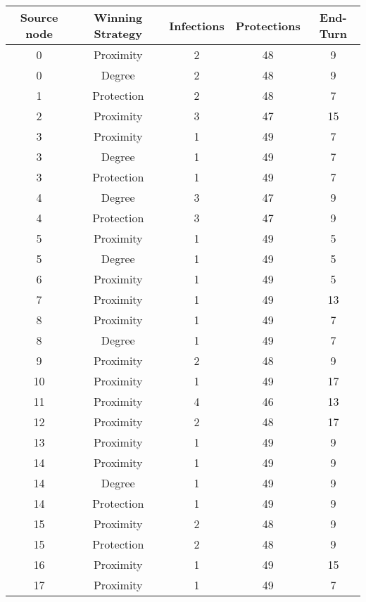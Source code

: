 \documentclass[results.tex]{subfiles}
\begin{document}
\begin{center}
  \begin{tabular}{| c || c | c | c | c |}
    \hline
    {\bfseries Source node} & {\bfseries Winning Strategy} & {\bfseries Infections} & {\bfseries Protections} & {\bfseries End-Turn} \\  %
    \hline\hline
    0 & Proximity & 2 & 48 & 9 \\ 
    \hline
    0 & Degree & 2 & 48 & 9 \\ 
    \hline
    1 & Protection & 2 & 48 & 7 \\ 
    \hline
    2 & Proximity & 3 & 47 & 15 \\ 
    \hline
    3 & Proximity & 1 & 49 & 7 \\ 
    \hline
    3 & Degree & 1 & 49 & 7 \\ 
    \hline
    3 & Protection & 1 & 49 & 7 \\ 
    \hline
    4 & Degree & 3 & 47 & 9 \\ 
    \hline
    4 & Protection & 3 & 47 & 9 \\ 
    \hline
    5 & Proximity & 1 & 49 & 5 \\ 
    \hline
    5 & Degree & 1 & 49 & 5 \\ 
    \hline
    6 & Proximity & 1 & 49 & 5 \\ 
    \hline
    7 & Proximity & 1 & 49 & 13 \\ 
    \hline
    8 & Proximity & 1 & 49 & 7 \\ 
    \hline
    8 & Degree & 1 & 49 & 7 \\ 
    \hline
    9 & Proximity & 2 & 48 & 9 \\ 
    \hline
    10 & Proximity & 1 & 49 & 17 \\ 
    \hline
    11 & Proximity & 4 & 46 & 13 \\ 
    \hline
    12 & Proximity & 2 & 48 & 17 \\ 
    \hline
    13 & Proximity & 1 & 49 & 9 \\ 
    \hline
    14 & Proximity & 1 & 49 & 9 \\ 
    \hline
    14 & Degree & 1 & 49 & 9 \\ 
    \hline
    14 & Protection & 1 & 49 & 9 \\ 
    \hline
    15 & Proximity & 2 & 48 & 9 \\ 
    \hline
    15 & Protection & 2 & 48 & 9 \\ 
    \hline
    16 & Proximity & 1 & 49 & 15 \\ 
    \hline
    17 & Proximity & 1 & 49 & 7 \\ 

\end{tabular}
\end{center}
\end{document}
